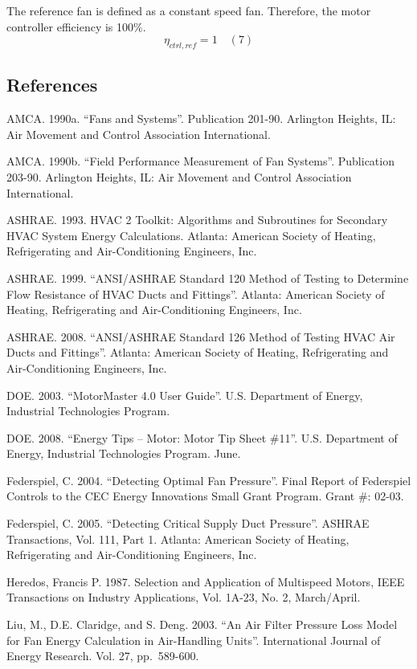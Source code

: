 The reference fan is defined as a constant speed fan. Therefore, the motor controller efficiency is 100$\%$.
$$\eta_{ctrl,ref} = 1 \quad (7) $$ 


\subsection{References}\label{references-002}

AMCA. 1990a. ``Fans and Systems''. Publication 201-90. Arlington Heights, IL: Air Movement and Control Association International.

AMCA. 1990b. ``Field Performance Measurement of Fan Systems''. Publication 203-90. Arlington Heights, IL: Air Movement and Control Association International.

ASHRAE. 1993. HVAC 2 Toolkit: Algorithms and Subroutines for Secondary HVAC System Energy Calculations. Atlanta: American Society of Heating, Refrigerating and Air-Conditioning Engineers, Inc.

ASHRAE. 1999. ``ANSI/ASHRAE Standard 120 Method of Testing to Determine Flow Resistance of HVAC Ducts and Fittings''. Atlanta: American Society of Heating, Refrigerating and Air-Conditioning Engineers, Inc.

ASHRAE. 2008. ``ANSI/ASHRAE Standard 126 Method of Testing HVAC Air Ducts and Fittings''. Atlanta: American Society of Heating, Refrigerating and Air-Conditioning Engineers, Inc.

DOE. 2003. ``MotorMaster 4.0 User Guide''. U.S. Department of Energy, Industrial Technologies Program.

DOE. 2008. ``Energy Tips -- Motor: Motor Tip Sheet \#11''. U.S. Department of Energy, Industrial Technologies Program. June.

Federspiel, C. 2004. ``Detecting Optimal Fan Pressure''. Final Report of Federspiel Controls to the CEC Energy Innovations Small Grant Program. Grant \#: 02-03.

Federspiel, C. 2005. ``Detecting Critical Supply Duct Pressure''. ASHRAE Transactions, Vol. 111, Part 1. Atlanta: American Society of Heating, Refrigerating and Air-Conditioning Engineers, Inc.

Heredos, Francis P. 1987. Selection and Application of Multispeed Motors, IEEE Transactions on Industry Applications, Vol. 1A-23, No. 2, March/April.

Liu, M., D.E. Claridge, and S. Deng. 2003. ``An Air Filter Pressure Loss Model for Fan Energy Calculation in Air-Handling Units''. International Journal of Energy Research. Vol. 27, pp.~589-600.

